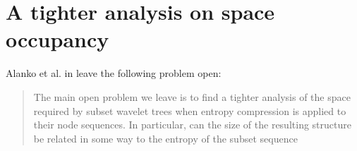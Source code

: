 \section{A tighter analysis on space occupancy}
Alanko et al. in \cite{SubsetWT} leave the following problem open:
\begin{quote}
    The main open problem we leave is to find a tighter analysis of the space required by subset wavelet trees when entropy compression is applied to their node sequences. In particular, can the size of the resulting structure be related in some way to the entropy of the subset sequence
\end{quote}
